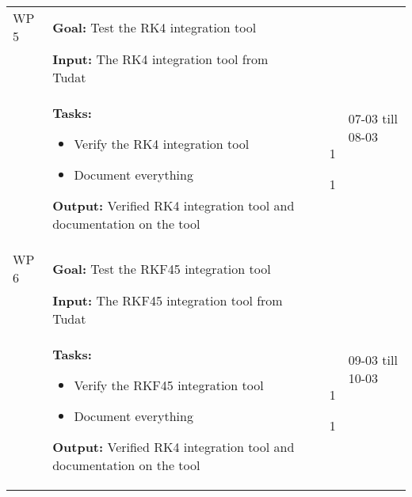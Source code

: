 \begin{longtable}{|p{2cm}|p{10cm}|p{1cm}|p{1cm}|}

WP 5 & \textbf{Goal:} Test the \ac{RK4} integration tool &  & \multirow{3}{1cm}{07-03 till 08-03}  \\ 
&\textbf{Input:} The \ac{RK4} integration tool from Tudat& & \\
& \textbf{Tasks:}
\begin{itemize}
\item Verify the \ac{RK4} integration tool 
\item Document everything
\end{itemize} 
\textbf{Output:} Verified \ac{RK4} integration tool and documentation on the tool & \noindent \begin{itemize}[leftmargin=*]
\item[1] 
\item[1]
\end{itemize} & \\ \hline




WP 6 & \textbf{Goal:} Test the \ac{RKF45} integration tool &  & \multirow{3}{1cm}{09-03 till 10-03}  \\ 
&\textbf{Input:} The \ac{RKF45} integration tool from Tudat & & \\
& \textbf{Tasks:}
\begin{itemize}
\item Verify the \ac{RKF45} integration tool
\item Document everything
\end{itemize} 
\textbf{Output:} Verified \ac{RK4} integration tool and documentation on the tool & \noindent \begin{itemize}[leftmargin=*]
\item[1]
\item[1]
\end{itemize} & \\ \hline


\end{longtable}
